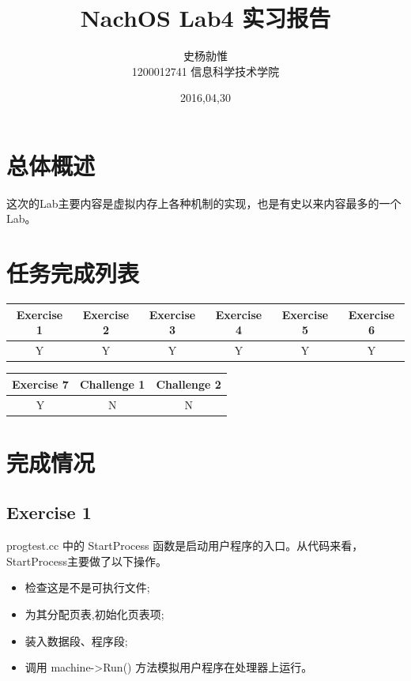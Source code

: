 \documentclass[nofonts]{ctexart}
\begin{document}
\title{%
\vspace{-30mm}\Huge NachOS Lab4 实习报告 \vspace{10mm}}
\author{%
\Large 史杨勍惟 
\\[10mm] 1200012741 信息科学技术学院}
\date{2016,04,30}

\maketitle

\newpage
\tableofcontents
\newpage

\section{总体概述}
这次的Lab主要内容是虚拟内存上各种机制的实现，也是有史以来内容最多的一个 Lab。

\section{任务完成列表}
\begin{table}[h]
\footnotesize
\begin{tabular}{|c|c|c|c|c|c|}\hline
\textbf{Exercise 1} & \textbf{Exercise 2} &
\textbf{Exercise 3} & \textbf{Exercise 4} &
\textbf{Exercise 5} & \textbf{Exercise 6}\\\hline
Y & Y & Y & Y & Y & Y\\\hline

\end{tabular}
\begin{tabular}{|c|c|c|}\hline
\textbf{Exercise 7} & \textbf{Challenge 1} & \textbf{Challenge 2}\\\hline
Y & N & N\\\hline

\end{tabular}


\end{table}
\section{完成情况}
\subsection*{Exercise 1}
progtest.cc 中的 StartProcess 函数是启动用户程序的入口。从代码来看，StartProcess主要做了以下操作。
\begin{itemize}
\item 检查这是不是可执行文件;
\item 为其分配页表,初始化页表项;
\item 装入数据段、程序段;
\item 调用 machine->Run() 方法模拟用户程序在处理器上运行。
\end{itemize}
\end{document}
